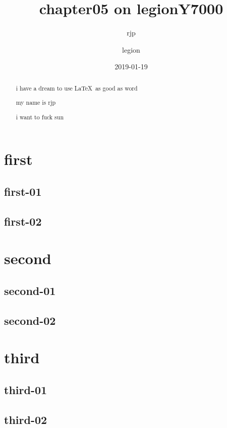 \documentclass[a4paper, UTF8]{article}
\begin{document}
\title{chapter05 on legionY7000}
\author{rjp \and legion}
\date{2019-01-19}
\maketitle
\begin{abstract}
    i have a dream to use \LaTeX\ as good as word

    my name is rjp

    i want to fuck sun
\end{abstract}
\newpage
{}

\tableofcontents
\newpage

\section{first}
\subsection{first-01}
\newpage
\subsection{first-02}
\newpage

\section{second}
\subsection{second-01}
\newpage
\subsection{second-02}
\newpage

\section{third}
\subsection{third-01}
\newpage
\subsection{third-02}

\end{document}
